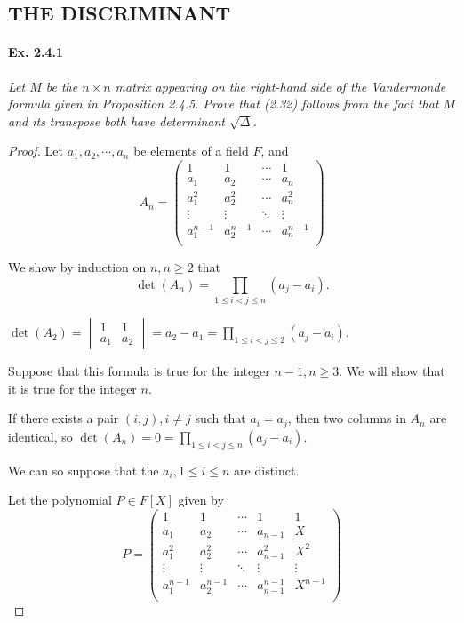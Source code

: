 \documentclass[11pt,a4paper]{article}
\begin{document}
\subsection{THE DISCRIMINANT}

\paragraph{Ex. 2.4.1}

{\it Let $M$ be the $n\times n$ matrix appearing on the right-hand side of the Vandermonde formula given in Proposition 2.4.5. Prove that (2.32) follows from the fact that $M$ and its transpose both have determinant $\sqrt{\Delta}$.
}

\begin{proof}
Let $a_1,a_2,\cdots,a_n$ be elements of a field $F$, and 
$$
A_n = 
\begin{pmatrix}
1    & 1     &   \cdots    & 1\\
a_1&  a_2 &   \cdots   & a_n\\
a_1^2&  a_2^2 &   \cdots   & a_n^2\\
\vdots & \vdots & \ddots & \vdots\\
a_1^{n-1}&  a_2^{n-1} &   \cdots   & a_n^{n-1}\\
\end{pmatrix}
$$

We show by induction on $n,n\geq 2$ that $$\det(A_n) = \prod\limits_{1\leq i < j \leq n} (a_j - a_i).$$

$\det(A_2) = 
\begin{vmatrix}   1 & 1\\ a_1 & a_2 \end{vmatrix} = a_2 - a_1 = \prod\limits_{1 \leq i < j \leq 2} (a_j - a_i).
$

Suppose that this formula is true for the integer $n-1, n\geq 3$. We will show that it is true for the integer $n$.

If there exists a pair  $(i,j), i\neq j$ such that $a_i = a_j$, then two columns in $A_n$ are identical, so $\det(A_n) = 0=\prod\limits_{1\leq i < j \leq n} (a_j - a_i).$

We can so suppose that the $a_i, 1 \leq i \leq n$ are distinct.

Let the polynomial  $P \in F[X]$ given by 
$$
P= 
\begin{pmatrix}
1    & 1     &   \cdots    & 1& 1\\
a_1&  a_2 &   \cdots   & a_{n-1}& X\\
a_1^2&  a_2^2 &   \cdots & a_{n-1}^2  & X^2\\
\vdots & \vdots & \ddots &\vdots& \vdots\\
a_1^{n-1}&  a_2^{n-1} &   \cdots & a_{n-1}^{n-1}  & X^{n-1}\\
\end{pmatrix}
$$


\end{proof}
\end{document}
